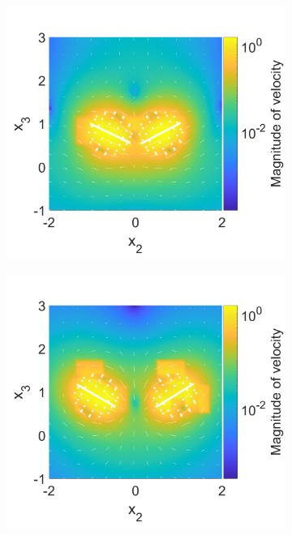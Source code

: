 \begin{figure}
\begin{subfigure}[b]{0.328\textwidth}
    \caption[]{\label{fig:PairF}}
\end{subfigure}
\begin{subfigure}[b]{0.328\textwidth}
    \centering
    \includegraphics[width=\textwidth]{Images/squirmers/Pair-7.pdf}
    \caption[]{\label{fig:PairG}}
\end{subfigure}
\begin{subfigure}[b]{0.328\textwidth}
    \centering
    \includegraphics[width=\textwidth]{Images/squirmers/Pair-8.pdf}

\end{subfigure}
\end{figure}
